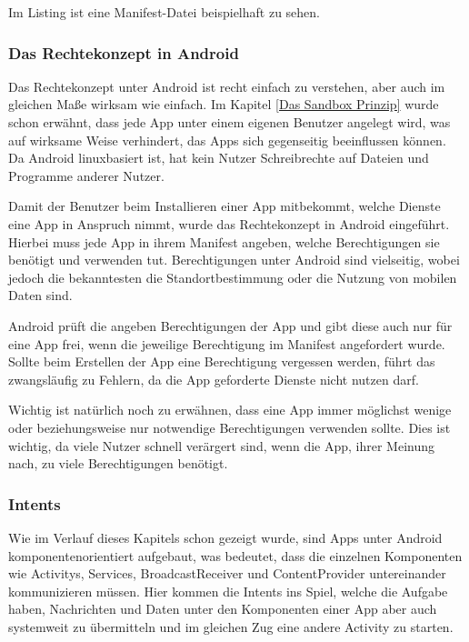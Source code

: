 Im Listing ist eine Manifest-Datei beispielhaft zu sehen.



\subsubsection{Das Rechtekonzept in Android}
Das Rechtekonzept unter Android ist recht einfach zu verstehen, aber auch im gleichen Ma\ss{}e wirksam wie einfach. Im Kapitel \ref{Das Sandbox Prinzip} wurde schon erw\"ahnt, dass jede App unter einem eigenen Benutzer angelegt wird, was auf wirksame Weise verhindert, das Apps sich gegenseitig beeinflussen k\"onnen. Da Android linuxbasiert ist, hat kein Nutzer Schreibrechte auf Dateien und Programme anderer Nutzer.

Damit der Benutzer beim Installieren einer App mitbekommt, welche Dienste eine App in Anspruch nimmt, wurde das Rechtekonzept in Android eingef\"uhrt. Hierbei muss jede App in ihrem Manifest angeben, welche Berechtigungen sie ben\"otigt und verwenden tut. Berechtigungen unter Android sind vielseitig, wobei jedoch die bekanntesten die Standortbestimmung oder die Nutzung von mobilen Daten sind. \cite{BerechtigungenPIT}

Android pr\"uft die angeben Berechtigungen der App und gibt diese auch nur f\"ur eine App frei, wenn die jeweilige Berechtigung im Manifest angefordert wurde. Sollte beim Erstellen der App eine Berechtigung vergessen werden, f\"uhrt das zwangsl\"aufig zu Fehlern, da die App geforderte Dienste nicht nutzen darf.

Wichtig ist nat\"urlich noch zu erw\"ahnen, dass eine App immer m\"oglichst wenige oder beziehungsweise nur notwendige Berechtigungen verwenden sollte. Dies ist wichtig, da viele Nutzer schnell ver\"argert sind, wenn die App, ihrer Meinung nach, zu viele Berechtigungen ben\"otigt. \cite{BerechtigungenPIT}

\subsubsection{Intents} \label{Intents}
Wie im Verlauf dieses Kapitels schon gezeigt wurde, sind Apps unter Android komponentenorientiert aufgebaut, was bedeutet, dass die einzelnen Komponenten wie Activitys, Services, BroadcastReceiver und ContentProvider untereinander kommunizieren m\"ussen. Hier kommen die Intents ins Spiel, welche die Aufgabe haben, Nachrichten und Daten unter den Komponenten einer App aber auch systemweit zu \"ubermitteln und im gleichen Zug eine andere Activity zu starten.

